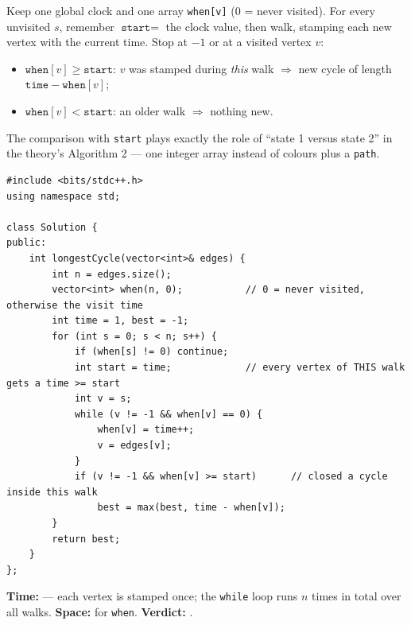\begin{algorithmbox}
Keep one global clock and one array \texttt{when[v]} ($0$ = never visited). For every unvisited $s$, remember $\texttt{start} = $ the clock value, then walk, stamping each new vertex with the current time. Stop at $-1$ or at a visited vertex $v$:
\begin{itemize}[leftmargin=*]
    \item $\texttt{when}[v] \ge \texttt{start}$: $v$ was stamped during \emph{this} walk $\Rightarrow$ new cycle of length $\texttt{time} - \texttt{when}[v]$;
    \item $\texttt{when}[v] < \texttt{start}$: an older walk $\Rightarrow$ nothing new.
\end{itemize}
The comparison with \texttt{start} plays exactly the role of ``state 1 versus state 2'' in the theory's Algorithm 2 --- one integer array instead of colours plus a \texttt{path}.

\begin{lstlisting}[style=cpp]
#include <bits/stdc++.h>
using namespace std;

class Solution {
public:
    int longestCycle(vector<int>& edges) {
        int n = edges.size();
        vector<int> when(n, 0);           // 0 = never visited, otherwise the visit time
        int time = 1, best = -1;
        for (int s = 0; s < n; s++) {
            if (when[s] != 0) continue;
            int start = time;             // every vertex of THIS walk gets a time >= start
            int v = s;
            while (v != -1 && when[v] == 0) {
                when[v] = time++;
                v = edges[v];
            }
            if (v != -1 && when[v] >= start)      // closed a cycle inside this walk
                best = max(best, time - when[v]);
        }
        return best;
    }
};
\end{lstlisting}

\begin{complexitybox}
\textbf{Time:}  --- each vertex is stamped once; the \texttt{while} loop runs $n$ times in total over all walks. \textbf{Space:}  for \texttt{when}. \textbf{Verdict:} \ac{}.
\end{complexitybox}
\end{algorithmbox}

